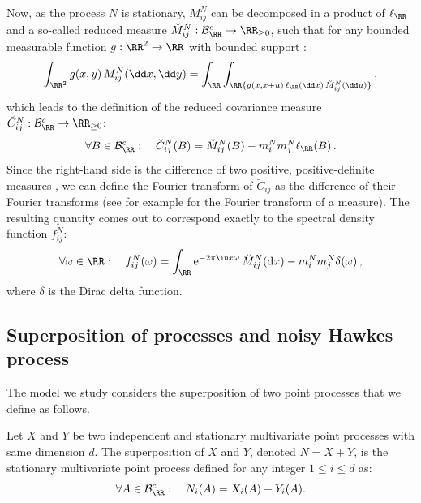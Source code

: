         Now, as the process $N$ is stationary,
        $M_{ij}^N$ can be decomposed in a product of $\ell_{\RR}$ and a so-called reduced measure $\breve M_{ij}^N : \mathcal B_\RR^c \to \RR_{\ge0}$,
        such that for any bounded measurable function $g : \RR^2 \to \RR$ with bounded support \parencite[Equation 8.1.1a]{DaleyV1}:
        \begin{equation}\label{eq:chap3_reduced_moment_measure_property}
            \int_{\RR^2}{g(x,y) \, M_{ij}^N(\dd x, \dd y)} = \int_\RR \int_\RR {g(x, x+u) \,\ell_{\RR}(\dd x) \, \breve M_{ij}^N(\dd u)}\,,
        \end{equation}
        which leads to the definition of the reduced covariance measure \(\breve C_{ij}^N : \mathcal B_\RR^c \to \RR_{\ge0}\):
        \begin{equation}\label{eq:chap3_breve_c_definition}
        		\forall B \in \mathcal B_\RR^c: \quad
        		\breve C_{ij}^N(B) = \breve M_{ij}^N(B) - m_i^N m_j^N\ell_{\RR}(B)\,.
        \end{equation}
        Since the right-hand side is the difference of two positive, positive-definite measures \parencite[Section~8.6]{DaleyV1}, 
        we can define the Fourier transform of $\breve C_{ij}$ as the difference of their Fourier transforms (see for example \parencite[Equation 5.2.1]{Pinsky2008} for the Fourier transform of a measure).
        The resulting quantity comes out to correspond exactly to the spectral density function \(f^N_{ij}\):
        \begin{equation}\label{eq:chap3_spectral_reduced}
          \forall \omega\in\RR: \quad
          f^N_{ij}(\omega) = \int_{\RR}{\mathrm{e}^{-2\pi \iu x \omega} \,\breve M_{ij}^N(\mathrm{d}x)} - m_i^N m_j^N \delta(\omega)\,,
        \end{equation}
        where \(\delta\) is the Dirac delta function.
    
        
      \subsection{Superposition of processes and noisy Hawkes process}\label{sec:chap3_superposition}
        The model we study considers the superposition of two point processes that we define as follows.
        \begin{definition}\label{def:chap3_superposition}
          Let $X$ and $Y$ be two independent and stationary multivariate point processes with same dimension $d$.
          The superposition of $X$ and $Y$, denoted $N = X + Y$, is the stationary multivariate point process defined for any integer $1 \le i \le d$ as:
          \[
            \forall A \in \mathcal B_\RR^c:
            \quad
            N_i(A) = X_i(A) + Y_i(A).
          \]
        \end{definition}
        
